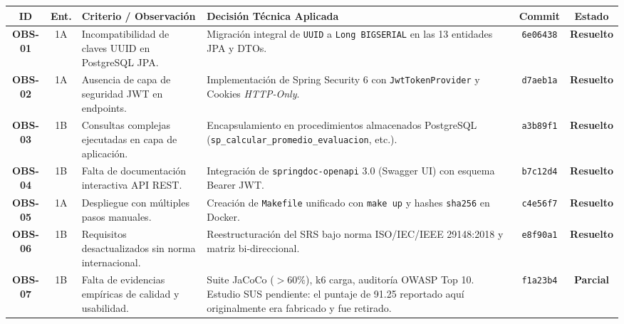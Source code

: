 \documentclass[10pt,a4paper]{article}
\begin{document}
\vspace{0.2cm}
\begin{table}[h!]
\centering
\small
\begin{tabular}{|c|c|p{4.2cm}|p{5.5cm}|c|c|}
\hline
\rowcolor{headergray}
\textbf{ID} & \textbf{Ent.} & \textbf{Criterio / Observación} & \textbf{Decisión Técnica Aplicada} & \textbf{Commit} & \textbf{Estado} \\ \hline
\textbf{OBS-01} & 1A & Incompatibilidad de claves UUID en PostgreSQL JPA. & Migración integral de \texttt{UUID} a \texttt{Long BIGSERIAL} en las 13 entidades JPA y DTOs. & \texttt{6e06438} & \textbf{Resuelto} \\ \hline
\textbf{OBS-02} & 1A & Ausencia de capa de seguridad JWT en endpoints. & Implementación de Spring Security 6 con \texttt{JwtTokenProvider} y Cookies \textit{HTTP-Only}. & \texttt{d7aeb1a} & \textbf{Resuelto} \\ \hline
\textbf{OBS-03} & 1B & Consultas complejas ejecutadas en capa de aplicación. & Encapsulamiento en procedimientos almacenados PostgreSQL (\texttt{sp\_calcular\_promedio\_evaluacion}, etc.). & \texttt{a3b89f1} & \textbf{Resuelto} \\ \hline
\textbf{OBS-04} & 1B & Falta de documentación interactiva API REST. & Integración de \texttt{springdoc-openapi} 3.0 (Swagger UI) con esquema Bearer JWT. & \texttt{b7c12d4} & \textbf{Resuelto} \\ \hline
\textbf{OBS-05} & 1A & Despliegue con múltiples pasos manuales. & Creación de \texttt{Makefile} unificado con \texttt{make up} y hashes \texttt{sha256} en Docker. & \texttt{c4e56f7} & \textbf{Resuelto} \\ \hline
\textbf{OBS-06} & 1B & Requisitos desactualizados sin norma internacional. & Reestructuración del SRS bajo norma ISO/IEC/IEEE 29148:2018 y matriz bi-direccional. & \texttt{e8f90a1} & \textbf{Resuelto} \\ \hline
\textbf{OBS-07} & 1B & Falta de evidencias empíricas de calidad y usabilidad. & Suite JaCoCo ($>60\%$), k6 carga, auditoría OWASP Top 10. Estudio SUS pendiente: el puntaje de 91.25 reportado aquí originalmente era fabricado y fue retirado. & \texttt{f1a23b4} & \textbf{Parcial} \\ \hline
\end{tabular}
\end{table}

\vspace{0.3cm}

\end{document}
